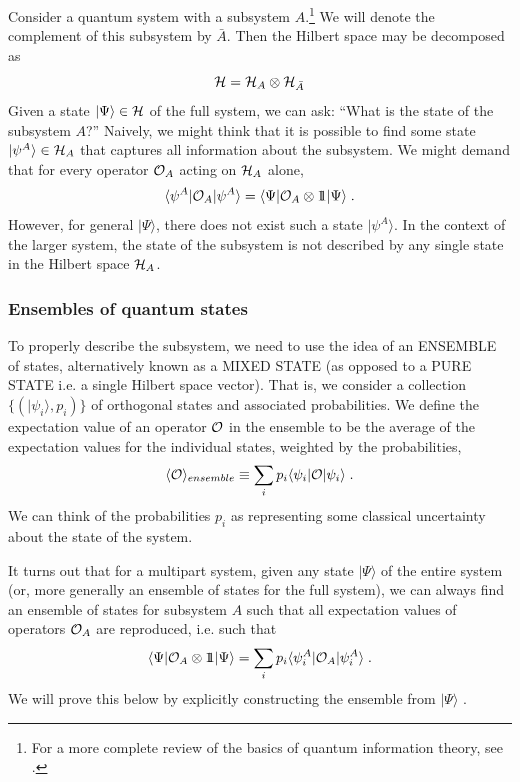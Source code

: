 \documentclass[12pt,epsf]{article}
\newcommand{\be}{\begin{equation}}
\newcommand{\ee}{\end{equation}}
\def\identity{{\rlap{1} \hskip 1.6pt \hbox{1}}}
\begin{document}
Consider a quantum system with a subsystem $A$.\footnote{For a more complete review of the basics of quantum information theory, see \cite{nielsen2010quantum}.} We will denote the complement of this subsystem by $\bar{A}$. Then the Hilbert space may be decomposed as
\be
{\cal H} = {\cal H}_A \otimes {\cal H}_{\bar{A}}
\ee
Given a state $|\Psi \rangle \in {\cal H}$ of the full system, we can ask: ``What is the state of the subsystem $A$?'' Naively, we might think that it is possible to find some state $|\psi^A \rangle \in {\cal H}_A$ that captures all information about the subsystem. We might demand that for every operator ${\cal O}_A$ acting on ${\cal H}_A$ alone,
\be
 \langle \psi^A |{\cal O}_A |\psi^A \rangle = \langle \Psi |{\cal O}_A \otimes \identity |\Psi \rangle  \; .
\ee
However, for general $|\Psi \rangle$, there does not exist such a state $|\psi^A \rangle$. In the context of the larger system, the state of the subsystem is not described by any single state in the Hilbert space ${\cal H}_A$.

\subsubsection*{Ensembles of quantum states}

To properly describe the subsystem, we need to use the idea of an ENSEMBLE of states, alternatively known as a MIXED STATE (as opposed to a PURE STATE i.e. a single Hilbert space vector). That is, we consider a collection $\{ (|\psi_i \rangle, p_i)\}$ of orthogonal states and associated probabilities. We define the expectation value of an operator ${\cal O}$ in the ensemble to be the average of the expectation values for the individual states, weighted by the probabilities,
\be
\langle {\cal O} \rangle_{ensemble} \equiv \sum_i p_i \langle \psi_i |{\cal O} |\psi_i \rangle \; .
\ee
We can think of the probabilities $p_i$ as representing some classical uncertainty about the state of the system.

It turns out that for a multipart system, given any state $|\Psi \rangle$ of the entire system (or, more generally an ensemble of states for the full system), we can always find an ensemble of states for subsystem $A$ such that all expectation values of operators ${\cal O}_A$ are reproduced, i.e. such that
\be
\label{dmcondition}
\langle \Psi |{\cal O}_A \otimes \identity |\Psi \rangle = \sum_i p_i  \langle \psi_i^A |{\cal O}_A |\psi_i^A \rangle \; .
\ee
We will prove this below by explicitly constructing the ensemble from $|\Psi \rangle$ .
\end{document}
